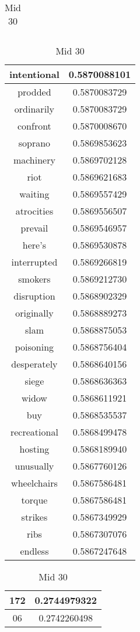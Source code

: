 \documentclass{article}
\begin{document}
\begin{table}[ht]
{\begin{tabular}{|c|c|}
\hline
\end{tabular}
\caption{Top 30}
}
\hfill
\parbox{.22\linewidth}{
\centering
\begin{tabular}{|c|c|}
\hline
intentional & 0.5870088101 \\
\hline
prodded & 0.5870083729 \\
\hline
ordinarily & 0.5870083729 \\
\hline
confront & 0.5870008670 \\
\hline
soprano & 0.5869853623 \\
\hline
machinery & 0.5869702128 \\
\hline
riot & 0.5869621683 \\
\hline
waiting & 0.5869557429 \\
\hline
atrocities & 0.5869556507 \\
\hline
prevail & 0.5869546957 \\
\hline
here’s & 0.5869530878 \\
\hline
interrupted & 0.5869266819 \\
\hline
smokers & 0.5869212730 \\
\hline
disruption & 0.5868902329 \\
\hline
originally & 0.5868889273 \\
\hline
slam & 0.5868875053 \\
\hline
poisoning & 0.5868756404 \\
\hline
desperately & 0.5868640156 \\
\hline
siege & 0.5868636363 \\
\hline
widow & 0.5868611921 \\
\hline
buy & 0.5868535537 \\
\hline
recreational & 0.5868499478 \\
\hline
hosting & 0.5868189940 \\
\hline
unusually & 0.5867760126 \\
\hline
wheelchairs & 0.5867586481 \\
\hline
torque & 0.5867586481 \\
\hline
strikes & 0.5867349929 \\
\hline
ribs & 0.5867307076 \\
\hline
endless & 0.5867247648 \\
\hline
\end{tabular}
\caption{Mid 30}
}
\hfill
\parbox{.23\linewidth}{
\centering
\begin{tabular}{|c|c|}
\hline
172 & 0.2744979322 \\
\hline
06 & 0.2742260498 \\

\end{tabular}}
\end{table}
\end{document}
